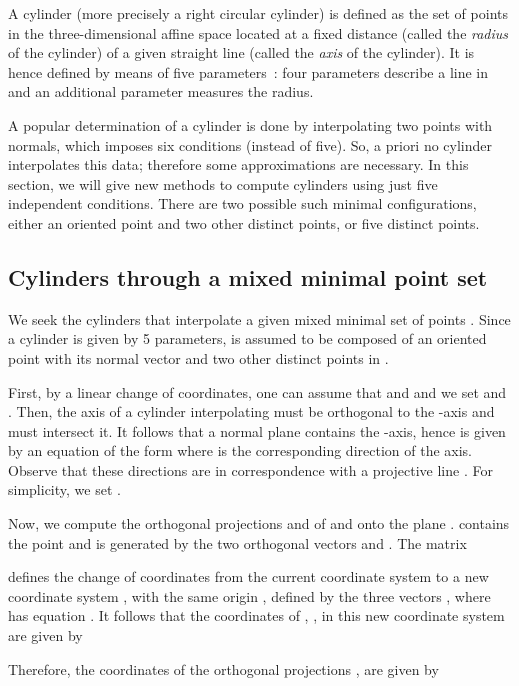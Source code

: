 \documentclass[5p]{elsarticle}
\newcommand{\com}[1]{{\color{black} #1}}
\begin{document}
A cylinder (more precisely a right circular cylinder) is defined as the set of points in the three-dimensional affine space  located at a fixed distance (called the \emph{radius} of the cylinder) of a given straight line (called the \emph{axis} of the cylinder). It is hence defined by means of five parameters~: four parameters describe a line in  and an additional parameter measures the radius. 


\medskip

A popular determination of a cylinder is done \com{by interpolating} two points with normals, which imposes six conditions (instead of five). So, a priori no cylinder interpolates \com{this data}; therefore some approximations are necessary.  In this section, we will give new methods to compute  \com{cylinders} using just five independent conditions. There are two possible such minimal configurations, either an oriented point and two other distinct points, or five distinct points.  


\subsection{Cylinders through a mixed minimal point set}

\com{We seek} the cylinders that interpolate a given mixed minimal set of points . Since a cylinder is given by 5 parameters,  is assumed to be composed of an oriented point  with its normal vector  and two other distinct points  in . 

\medskip

First, by a linear change of coordinates, one can assume that  and   and we set  and . Then, the axis of a cylinder interpolating  must be orthogonal to the -axis and must intersect it. It follows that a normal plane  contains the -axis, hence is given by an equation of the form  where  is the corresponding direction of the axis. Observe that these directions are in correspondence with a projective line . For simplicity, we set .

Now, we compute the orthogonal projections  and  of  and  onto the plane .  contains the point  and is generated by the two orthogonal vectors  and . The matrix

defines the change of coordinates from the current coordinate system  to a new coordinate  system , with the same origin , defined by the three vectors   , where  has equation . It follows that the coordinates  of , , in this new coordinate system are given by

Therefore, the coordinates of the orthogonal projections ,  are given by
\end{document}
